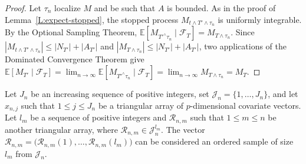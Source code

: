 \documentclass[aoas,preprint]{imsart}
\begin{document}
\begin{proof}
    Let $\tau_n$ localize $M$ and be such that $A$ is bounded.
    As in the proof of Lemma~\ref{L:expect-stopped}, the stopped process
    $M_{t \wedge T' \wedge \tau_n}$ is uniformly integrable.
    By the Optional Sampling Theorem,
    \(
        \mathbb{E} [ M_{T'^\wedge \tau_n} \mid \mathcal{F}_T ]
            = M_{T \wedge \tau_n}.
    \)
    Since
    \(
        |M_{t \wedge T' \wedge \tau_n}|
        \leq
        |N_{T'}|
        +
        |A_{T'}|
    \)
    and $| M_{T \wedge \tau_n}| \leq |N_{T'}| + |A_{T'}|$,
    two applications of the Dominated Convergence Theorem give
    \(
        \mathbb{E} [ M_{T'} \mid \mathcal{F}_T ]
        =
        \lim_{n \to \infty}
        \mathbb{E} [ M_{T'^\wedge \tau_n} \mid \mathcal{F}_T ]
        =
        \lim_{n \to \infty}
        M_{T \wedge \tau_n}
        =
        M_T.
    \)
\end{proof}

\clearpage



Let $J_n$ be an increasing sequence of positive integers, set
$\mathcal{J}_n = \{ 1, \ldots, J_n \}$, and
let $x_{n,j}$ such that $1 \leq j \leq J_n$ be a triangular array of
$p$-dimensional covariate vectors.  Let $l_m$ be a sequence of positive
integers and $\mathcal{R}_{n,m}$ such that
$1 \leq m \leq n$ be another triangular array, where
$\mathcal{R}_{n,m} \in \mathcal{J}_n^{l_m}$.  The vector
\(
    \mathcal{R}_{n,m}
    =
    \big(
        \mathcal{R}_{n,m}(1), \ldots, \mathcal{R}_{n,m}(l_m)
    \big)
\)
can be considered an ordered sample of size $l_m$ from $\mathcal{J}_n$.
\end{document}
